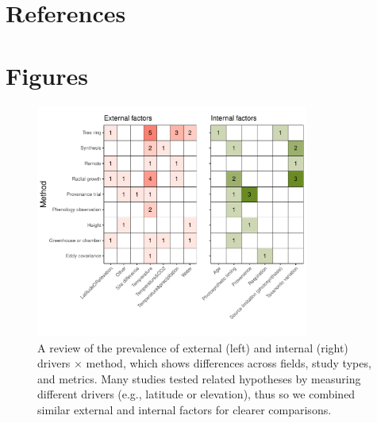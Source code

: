 \documentclass[11pt]{article}
\begin{document}


\clearpage
\section*{References}



\section*{Figures}


\clearpage
\begin{figure}[h!]
\includegraphics[width=0.8\textwidth]{..//figures/heatmaps/heatmap_combined_endo&exo.pdf}
\caption{A review of the prevalence of external (left) and internal (right) drivers $\times$ method, which shows differences across fields, study types, and metrics. Many studies tested related hypotheses by measuring different drivers (e.g., latitude or elevation), thus so we combined similar external and internal factors for clearer comparisons.}
\label{fig:heatmapssupp}
\end{figure}
\end{document}
